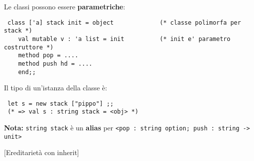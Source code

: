 \documentclass[a4paper,10pt]{article}
\begin{document}
Le classi possono essere \textbf{parametriche}:
\begin{lstlisting}
 class ['a] stack init = object             (* classe polimorfa per stack *)
    val mutable v : 'a list = init          (* init e' parametro costruttore *)
    method pop = ....
    method push hd = ....
    end;;
\end{lstlisting}

Il tipo di un'istanza della classe è:
\begin{lstlisting}
 let s = new stack ["pippo"] ;;
 (* => val s : string stack = <obj> *)
\end{lstlisting}
\textbf{Nota:} \texttt{string stack} è un \textbf{alias} per \texttt{<pop : string option; push : string -> unit>}


[Ereditarietà con inherit]
\end{document}
